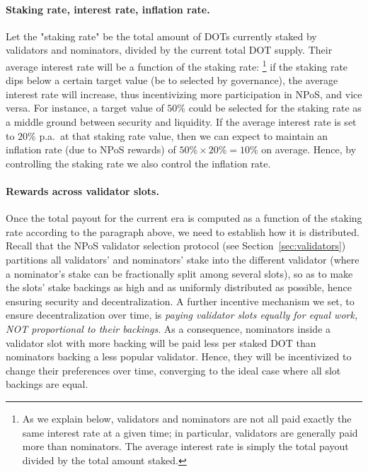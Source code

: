 \paragraph{Staking rate, interest rate, inflation rate.} Let the "staking rate" be the total amount of DOTs 
currently staked by validators and nominators, divided by the current total DOT supply. 
Their average interest rate will be a function of the staking rate:%
\footnote{As we explain below, validators and nominators are not all paid exactly the same 
interest rate at a given time; in particular, validators are generally paid more than nominators.  
The average interest rate is simply the total payout divided by the total amount staked.}
if the staking rate dips below a certain target value (be to selected by governance), 
the average interest rate will increase, thus incentivizing more participation in NPoS, and vice versa. 
For instance, a target value of $50\%$ could be selected for the staking rate as a middle ground between security 
and liquidity. If the average interest rate is set to $20\%$ p.a.~at that staking rate value, 
then we can expect to maintain an inflation rate (due to NPoS rewards) of $50\%\times 20\% = 10\%$ on average. 
Hence, by controlling the staking rate we also control the inflation rate. 


\paragraph{Rewards across validator slots.} Once the total payout for the current era is computed 
as a function of the staking rate according to the paragraph above, we need to establish how it is distributed.
Recall that the NPoS validator selection protocol (see Section~\ref{sec:validators}) 
partitions all validators' and nominators' stake into the different validator  
(where a nominator's stake can be fractionally split among several slots), so as to make the slots' 
stake backings as high and as uniformly distributed as possible, hence ensuring security and decentralization. 
A further incentive mechanism we set, to ensure decentralization over time, 
is \emph{paying validator slots equally for equal work, NOT proportional to their backings}. 
As a consequence, nominators inside a validator slot with more backing will be paid less per staked DOT 
than nominators backing a less popular validator. Hence, they will be incentivized to change 
their preferences over time, converging to the ideal case where all slot backings are equal.

